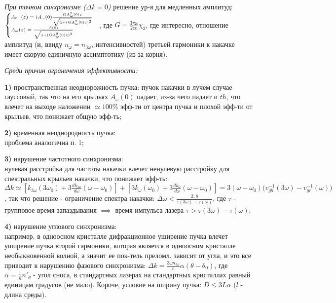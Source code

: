 \documentclass[a4paper,12pt]{article}
\theoremstyle{definition} %
\theoremstyle{definition} %
\theoremstyle{remark} %
\begin{document}
	\textit{При точном синхронизме ($\Delta k = 0$)} решение ур-я для медленных амплитуд: \\$\scriptsize
	\begin{cases}
		A_{3\omega}(z)=iA_{\omega}(0)\frac{GA_{\omega}^{2}(0)z}{\sqrt{1+(GA_{\omega}^{2}(0)z)^{2}}} \\
		A_{\omega}(z)=\frac{A(0)}{\sqrt{1+(GA_{\omega}^{2}(0)z)^{2}}}
	\end{cases}$, где $G=\frac{3\pi \omega}{2cn}\chi_{3}$, где интересно, отношение амплитуд (и, ввиду $n_{\omega}=n_{3\omega}$, интенсивностей) третьей гармоники к накачке имеет скорую единичную ассимптотику (из-за корня).


	\textit{Среди причин ограничения эффективности:}
	\par \textbf{1)} пространственная неоднорожность пучка:
	пучок накачки в лучем случае гауссовый, так что на его крыльях $A_{\omega}(0)$ падает, из-за чего падает и $th$, что влечет на выходе наложении $\simeq 100\%$ эфф-ти от центра пучка и плохой эфф-ти от крыльев, что понижает общую эфф-ть; \\
	\par \textbf{2)} временная неоднородность пучка: \\
	проблема аналогична п. 1; \\
	\par \textbf{3)} нарушение частотного синхронизма: \\
	нулевая расстройка для частоты накачки влечет ненулевую расстройку для спектральных крыльев накачки, что понижает эфф-ть: $\Delta k \simeq [k_{3\omega}(3\omega_{0})+3\frac{dk_{3\omega}}{d\omega}(\omega-\omega_{0})]+[3k_{\omega}(\omega_{0})+3\frac{dk_{\omega}}{d\omega}(\omega-\omega_{0})] = 3(\omega-\omega_{0}) \big( v_{gh}^{-1}(3\omega) - v_{gr}^{-1}(\omega) \big)$, так что решение - ограничение спектра накачки: $\Delta \omega < \frac{2,8}{\tau (3\omega) - \tau (\omega)}$, где $\tau$ - групповое время запаздывания $\implies$ время импульса лазера $\tau > \tau(3\omega)-\tau(\omega)$; \\ 
	\par \textbf{4)} нарушение углового синхронизма: \\
	например, в одноосном кристалле дифракционное уширение пучка влечет уширение пучка второй гармоники, которая является в одноосном кристалле необыкновенной волной, а значит ее пок-тель преломл. зависит от угла, и это все приводит к нарушению фазового синхронизма: $\Delta k = \frac{3\omega n_{3\omega}}{c}\alpha (\theta - \theta_{0})$, где $\alpha = \frac{1}{n}n'_{\theta}$ - угол сноса, в стандартных лазерах на стандартных кристаллах равный единицам градусов (не мало). Короче, условие на ширину пучка: $D \leq 3L \alpha$ ($l$ - длина среды).
\end{document}
